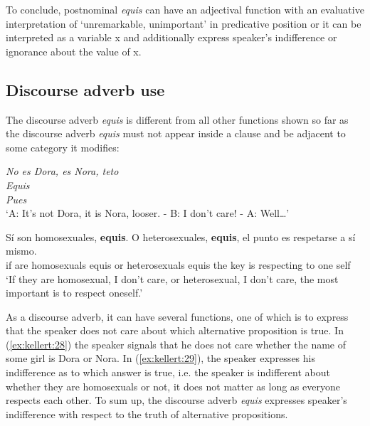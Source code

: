\documentclass[output=paper]{langsci/langscibook}
\begin{document}
\z

To conclude, postnominal \textit{equis} can have an adjectival function with an evaluative interpretation of ‘unremarkable, unimportant’ in predicative position or it can be interpreted as a variable x and additionally express speaker’s indifference or ignorance about the value of x.

\subsection{Discourse adverb use}\label{sec:kellert:2.4}
The discourse adverb \textit{equis} is different from all other functions shown so far as the discourse adverb \textit{equis} must not appear inside a clause and be adjacent to some category it modifies:

\ea\label{ex:kellert:28}
\begin{xlist}
 {\itshape No es Dora, es Nora, teto}\\
 {\itshape Equis}\\
 {\itshape Pues}\\
\glt ‘A: It’s not Dora, it is Nora, looser. - B: I don’t care! - A: Well…’
\end{xlist}
\z

\ea\label{ex:kellert:29}
\gll Sí son homosexuales, \textbf{equis}. O heterosexuales, \textbf{equis}, el punto es respetarse a sí mismo.\\
if are homosexuals equis or heterosexuals equis the key is respecting to one self\\
\glt ‘If they are homosexual, I don’t care, or heterosexual, I don’t care, the most important is to respect oneself.’
\z

As a discourse adverb, it can have several functions, one of which is to express that the speaker does not care about which alternative proposition is true. In (\ref{ex:kellert:28}) the speaker signals that he does not care whether the name of some girl is Dora or Nora. In (\ref{ex:kellert:29}), the speaker expresses his indifference as to which answer is true, i.e. the speaker is indifferent about whether they are homosexuals or not, it does not matter as long as everyone respects each other. To sum up, the discourse adverb \textit{equis} expresses speaker’s indifference with respect to the truth of alternative propositions.
\end{document}
